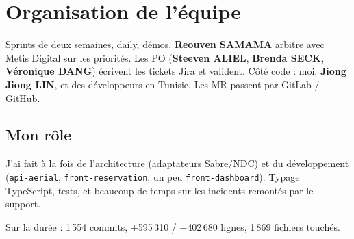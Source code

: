 \section{Organisation de l'équipe}

Sprints de deux semaines, daily, démos. \textbf{Reouven SAMAMA} arbitre avec Metis Digital sur les priorités. Les PO (\textbf{Steeven ALIEL}, \textbf{Brenda SECK}, \textbf{Véronique DANG}) écrivent les tickets Jira et valident. Côté code : moi, \textbf{Jiong Jiong LIN}, et des développeurs en Tunisie. Les MR passent par GitLab / GitHub.

\subsection{Mon rôle}

J'ai fait à la fois de l'architecture (adaptateurs Sabre/NDC) et du développement (\texttt{api-aerial}, \texttt{front-reservation}, un peu \texttt{front-dashboard}). Typage TypeScript, tests, et beaucoup de temps sur les incidents remontés par le support.

Sur la durée : 1\,554 commits, +595\,310 / $-$402\,680 lignes, 1\,869 fichiers touchés.

